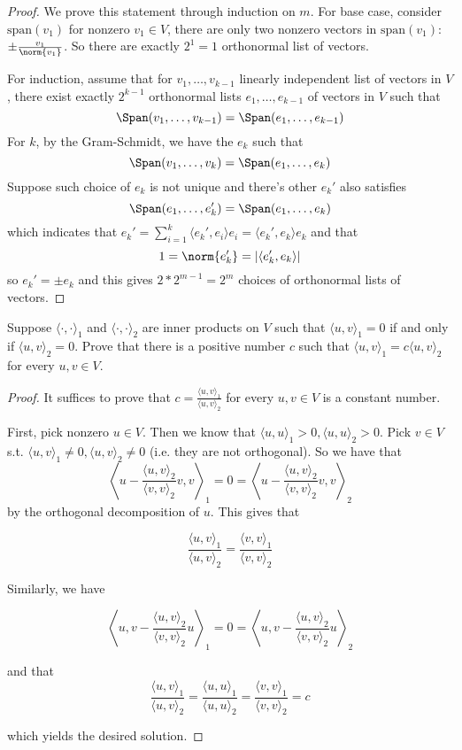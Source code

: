 \documentclass{extarticle}
\begin{document}
\begin{proof}
We prove this statement through induction on \(m\). For base case, consider \(\text{span}(v_1)\) for
nonzero \(v_1 \in V\), there are only two nonzero vectors in \(\text{span}(v_1)\): \(\pm \frac{v_1}{\norm{v_1}}\).
So there are exactly \(2^1 = 1\) orthonormal list of vectors.

For induction, assume that for \(v_1, \ldots, v_{k-1}\) linearly independent list of vectors in \(V\),
there exist exactly \(2^{k-1}\) orthonormal lists \(e_1, \ldots, e_{k-1}\) of vectors in \(V\) such that
\[\Span (v_1, \ldots, v_{k-1}) = \Span (e_1, \ldots, e_{k-1})\]
For \(k\), by the Gram-Schmidt, we have the \(e_k\) such that
\[\Span (v_1, \ldots, v_k) = \Span (e_1, \ldots, e_k)\]
Suppose such choice of \(e_k\) is not unique and there's other \(e_k'\) also satisfies
\[\Span(e_1, \ldots, e_k') = \Span(e_1, \ldots, e_k)\]
which indicates that \(e_k' = \sum_{i=1}^{k} \langle e_k',e_i \rangle e_i = \langle e_k',e_k \rangle e_k\) and that
\[1 = \norm{e_k'} = |\langle e_k', e_k \rangle|\]
so \(e_k' = \pm e_k\) and this gives \(2 * 2^{m-1} = 2^m\) choices of orthonormal lists of vectors.
\end{proof}

\begin{problem}{15}
    Suppose \(\langle \cdot,\cdot \rangle_1\) and \(\langle \cdot,\cdot \rangle_2\) are inner products on
    \(V\) such that \(\langle u,v \rangle_1 = 0\) if and only if \(\langle u,v \rangle_2 = 0\). Prove that
    there is a positive number \(c\) such that \(\langle u,v \rangle_1 = c \langle u,v \rangle_2\) for
    every \(u, v \in V\).
\end{problem}

\begin{proof}
It suffices to prove that \(c = \frac{\langle u,v \rangle_1}{\langle u,v \rangle_2}\) for every
\(u, v \in V\) is a constant number.

First, pick nonzero \(u \in V\). Then we know that \(\langle u,u \rangle_1 > 0, \langle u,u \rangle_2 > 0\).
Pick \(v \in V\) s.t. \(\langle u,v \rangle_1 \neq 0, \langle u,v \rangle_2 \neq 0\) (i.e. they are not
orthogonal). So we have that
\[ \left\langle u - \frac{\langle u,v \rangle_2}{\langle v,v \rangle_2}v, v \right\rangle_1 = 0  =
\left\langle u - \frac{\langle u,v \rangle_2}{\langle v,v \rangle_2}v, v \right\rangle_2 \]
by the orthogonal decomposition of \(u\). This gives that

\[\frac{\langle u,v \rangle_1}{\langle u,v \rangle_2} = \frac{\langle v,v \rangle_1}{\langle v,v \rangle_2}\]

Similarly, we have

\[ \left\langle u , v - \frac{\langle u,v \rangle_2}{\langle v,v \rangle_2}u \right\rangle_1 = 0  =
\left\langle u , v - \frac{\langle u,v \rangle_2}{\langle v,v \rangle_2}u \right\rangle_2 \]

and that
\[\frac{\langle u,v \rangle_1}{\langle u,v \rangle_2} = \frac{\langle u,u \rangle_1}{\langle u,u \rangle_2}
= \frac{\langle v,v \rangle_1}{\langle v,v \rangle_2} = c\]

which yields the desired solution.
\end{proof}
\end{document}
